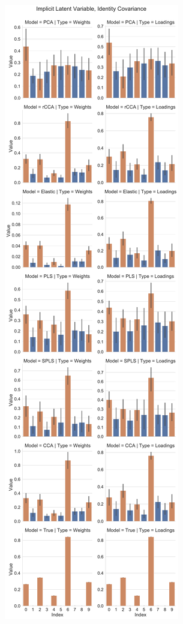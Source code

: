 \begin{figure}
\centering
\begin{subfigure}{0.49\linewidth}
\centering
\includegraphics[width=\linewidth]{figures/simulated/low/Combined_Weights_Loadings_with_Error_Bars_Identity_Covariance_implicit}

\end{subfigure}
\end{figure}
